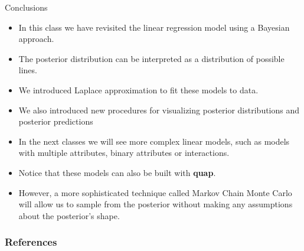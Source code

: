 \documentclass[handout]{beamer}
\begin{document}
\begin{frame}{Conclusions}
\scriptsize{

\begin{itemize}
\item In this class we have revisited the linear regression model using a Bayesian approach.

\item The posterior distribution can be interpreted as a distribution of possible lines.

\item We introduced Laplace approximation to fit these models to data.

\item We also introduced new procedures for visualizing posterior distributions and posterior predictions

\item In the next classes we will see more complex linear models, such as models with multiple attributes, binary attributes or interactions.

\item Notice that these models can also be built with \textbf{quap}.

\item However, a more sophisticated technique called Markov Chain Monte Carlo will allow us to sample from the posterior without making any assumptions about the posterior's shape.


\end{itemize}


} 
\end{frame}


\begin{frame}[allowframebreaks]\scriptsize
\frametitle{References}


%
\end{frame}  









\end{document}
